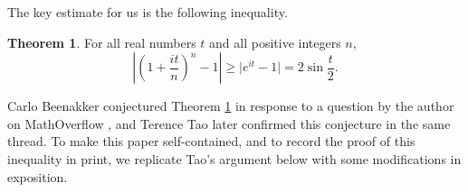 \documentclass[11pt]{article}
\theoremstyle{definition}
\newtheorem{thm}{Theorem}
\newcommand{\abs}[1]{\left|#1\right|}
\begin{document}
The key estimate for us is the following inequality.

\begin{thm}\label{thm:MO-ineq}
	For all real numbers $t$ and all positive integers $n$,
	\begin{equation}\label{eqn:tao-ineq}
		\abs{\left(1+\frac{it}n\right)^n - 1} \geq \big|e^{it} - 1\big| = 2\sin\frac t2.
	\end{equation}
\end{thm}

Carlo Beenakker conjectured Theorem \ref{thm:MO-ineq} in response to a question by the author on MathOverflow \cite{tao-MO}, and Terence Tao later confirmed this conjecture in the same thread. To make this paper self-contained, and to record the proof of this inequality in print, we replicate Tao's argument below with some modifications in exposition.
\end{document}
